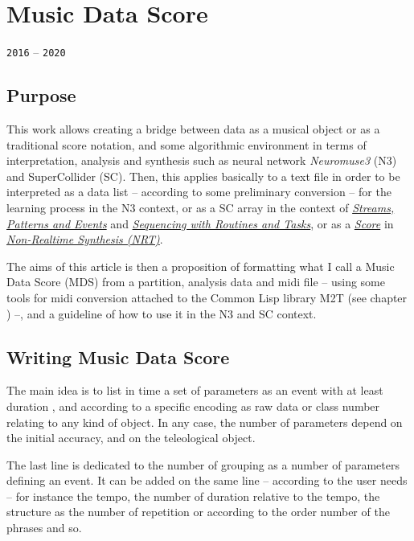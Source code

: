 \chapter{Music Data Score}
\thispagestyle{empty}

\label{mds}
{\texttt{2016} -- \texttt{2020}}

\bigskip
\smallskip

\section{Purpose}
\label{purp}

This work allows creating a bridge between data as a musical object or as a traditional score notation, and some algorithmic environment in terms of interpretation, analysis and synthesis such as neural network \textsl{Neuromuse3} (N3) and SuperCollider (SC). Then, this applies basically to a text file in order to be interpreted as a data list -- according to some preliminary conversion -- for the learning process in the N3 context, 
or as a SC array in the context of \href{http://doc.sccode.org/Tutorials/Streams-Patterns-Events1.html}{\textit{Streams, Patterns and Events}} and \href{http://doc.sccode.org/Tutorials/Getting-Started/15-Sequencing-with-Routines-and-Tasks.html}{\textit{Sequencing with Routines and Tasks}}, or as a \href{http://doc.sccode.org/Classes/Score.html}{\textit{Score}} in \href{http://doc.sccode.org/Guides/Non-Realtime-Synthesis.html}{\textit{Non-Realtime Synthesis (NRT)}}.

The aims of this article is then a proposition of formatting what I call a Music Data Score (MDS) from a partition, analysis data and midi file -- using some tools for midi conversion attached to the Common Lisp library M2T (see chapter \textsl{}) --, and a guideline of how to use it in the N3 and SC context.

\section{Writing Music Data Score}

The main idea is to list in time a set of parameters as an event with at least duration , and according to a specific encoding as raw data or class number relating to any kind of object. In any case, the number of parameters depend on the initial accuracy, and on the teleological object.

The last line is dedicated to the number of grouping as a number of parameters defining an event. It can be added on the same line -- according to the user needs -- for instance the tempo, the number of duration relative to the tempo, the structure as the number of repetition or according to the order number of the phrases and so.

